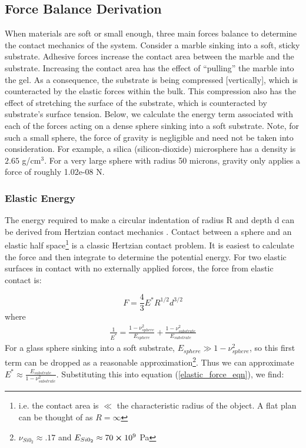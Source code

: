 \subsection{Force Balance Derivation}
When materials are soft or small enough, three main forces balance to determine the contact mechanics of the system. Consider a marble sinking into a soft, sticky substrate. Adhesive forces increase the contact area between the marble and the substrate. Increasing the contact area has the effect of ``pulling'' the marble into the gel. As a consequence, the substrate is being compressed [vertically], which is counteracted by the elastic forces within the bulk. This compression also has the effect of stretching the surface of the substrate, which is counteracted by substrate's surface tension. Below, we calculate the energy term associated with each of the forces acting on a dense sphere sinking into a soft substrate. Note, for such a small sphere, the force of gravity is negligible and need not be taken into consideration. For example, a silica (silicon-dioxide) microsphere has a density is $2.65$ g/cm$^3$. For a very large sphere with radius 50 microns, gravity only applies a force of roughly 1.02e-08 N.

\subsubsection{Elastic Energy}
The energy required to make a circular indentation of radius R and depth d can be derived from Hertzian contact mechanics \cite{hertz1882uber, style2013surface,cao2016nanoparticles}. Contact between a sphere and an elastic half space\footnote{i.e. the contact area is $ \ll $ the characteristic radius of the object. A flat plan can be thought of as $ R = \infty $}   is a classic Hertzian contact problem. It is easiest to calculate the force and then integrate to determine the potential energy. For two elastic surfaces in contact with no externally applied forces, the force from elastic contact is:

\begin{equation}
F = \frac{4}{3}E^*R^{1/2}d^{3/2}
\label{elastic_force_eqn}
\end{equation} 
where 
\begin{align*}
\frac{1}{E^*} = \frac{1-\nu_{sphere}^2}{E_{sphere}} + \frac{1-\nu_{substrate}^2}{E_{substrate}} 
\end{align*}
For a glass sphere sinking into a soft substrate, $ E_{sphere} \gg 1-\nu_{sphere}^2 $, so this first term can be dropped as a reasonable approximation\footnote{$\nu_{Si0_2} \approx .17 $ and $ E_{Si0_2} \approx 70 \cross 10^9 $ Pa}. Thus we can approximate $ E^* \approx \frac{E_{substrate}}{1-\nu_{substrate}^2} $. Substituting this into equation (\ref{elastic_force_eqn}), we find:

